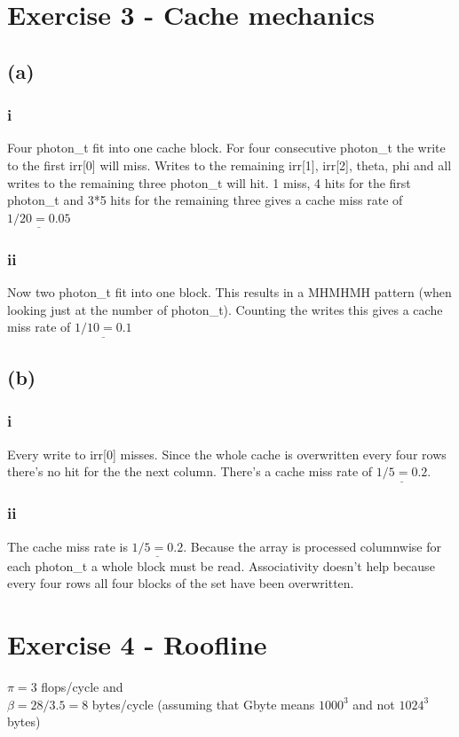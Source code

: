 \documentclass[10pt,a4paper,oneside,notitlepage]{report}
\begin{document}
\section*{Exercise 3 - Cache mechanics}
\subsection*{(a)}
\subsubsection*{i}
Four photon\_t fit into one cache block. For four consecutive photon\_t the write to the first irr[0] will miss. Writes to the remaining irr[1], irr[2], theta, phi and all writes to the remaining three photon\_t will hit. 1 miss, 4 hits for the first photon\_t and 3*5 hits for the remaining three gives a cache miss rate of $\underline{1/20=0.05}$
\subsubsection*{ii}
Now two photon\_t fit into one block. This results in a MHMHMH pattern (when looking just at the number of photon\_t). Counting the writes this gives a cache miss rate of $\underline{1/10=0.1}$
\subsection*{(b)}
\subsubsection*{i}
Every write to irr[0] misses. Since the whole cache is overwritten every four rows there's no hit for the the next column. There's a cache miss rate of $\underline{1/5=0.2}$.
\subsubsection*{ii}
The cache miss rate is $\underline{1/5=0.2}$. Because the array is processed columnwise for each photon\_t a whole block must be read. Associativity doesn't help because every four rows all four blocks of the set have been overwritten.

\section*{Exercise 4 - Roofline}
$\pi = 3$ flops/cycle and \\
$\beta = 28/3.5 =8$ bytes/cycle (assuming that Gbyte means $1000^3$ and not $1024^3$ bytes)
\end{document}
